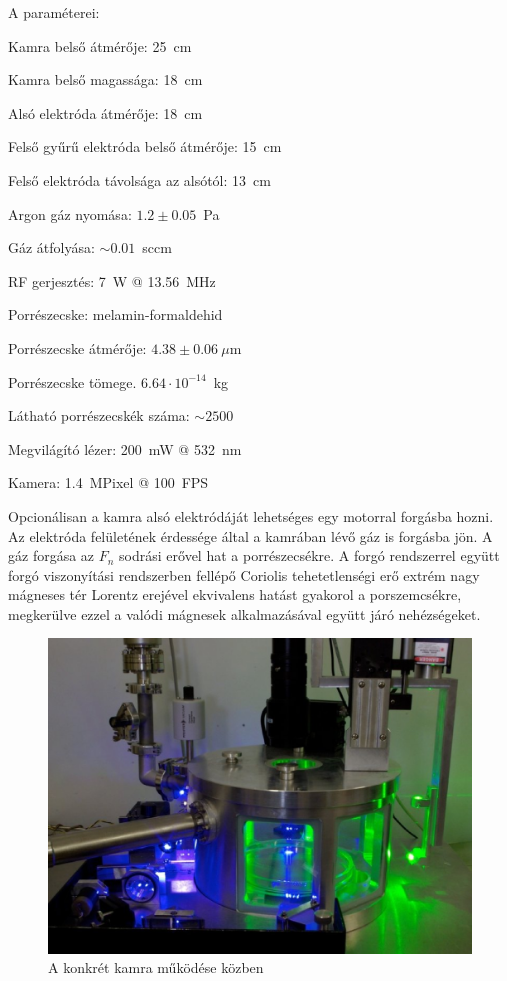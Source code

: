 	\noindent A paraméterei:
	\begin{myitemize*}
		\item Kamra belső átmérője: 25~cm
		\item Kamra belső magassága: 18~cm
		\item Alsó elektróda átmérője: 18~cm
		\item Felső gyűrű elektróda belső átmérője: 15~cm
		\item Felső elektróda távolsága az alsótól: 13~cm
		\item Argon gáz nyomása: $1.2\pm0.05$~Pa
		\item Gáz átfolyása: $\sim 0.01$~sccm
		\item RF gerjesztés: 7~W @ 13.56~MHz
		\item Porrészecske: melamin-formaldehid
		\item Porrészecske átmérője: $4.38\pm 0.06~\mu$m
		\item Porrészecske tömege. $6.64\cdot10^{-14}$~kg
		\item Látható porrészecskék száma: $\sim 2500$
		\item Megvilágító lézer: 200~mW @  532~nm
		\item Kamera: 1.4~MPixel @ 100~FPS
	\end{myitemize*}
	Opcionálisan a kamra alsó elektródáját lehetséges egy motorral forgásba
        hozni. Az elektróda felületének érdessége által a kamrában
	lévő gáz is forgásba jön. A gáz forgása az $F_n$ sodrási erővel hat a porrészecsékre.
	A forgó rendszerrel együtt forgó viszonyítási
          rendszerben fellépő Coriolis tehetetlenségi erő extrém nagy
          mágneses tér Lorentz erejével ekvivalens hatást gyakorol a
          porszemcsékre, megkerülve ezzel a valódi mágnesek
          alkalmazásával együtt járó nehézségeket.
	\begin{figure}[!h]
		\centering
		\includegraphics[width=0.9\columnwidth]{figures/eps/dusty2.eps}
		\caption{A konkrét kamra működése közben} 
		\label{fig:kamra}
	\end{figure}
	
